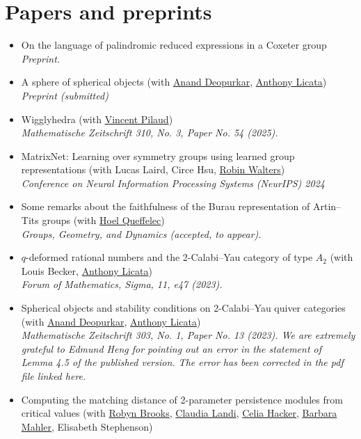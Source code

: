 \documentclass[a4paper]{moderncv}
\begin{document}
\section*{Papers and preprints}
\label{sec:orgbd9eb48}
\begin{itemize}
\item On the language of palindromic reduced expressions in a Coxeter group\\
\emph{Preprint.}
\item A sphere of spherical objects (with \href{https://deopurkar.github.io}{Anand Deopurkar}, \href{https://maths-people.anu.edu.au/\~licatat/Home.html}{Anthony Licata})\\
\emph{Preprint (submitted)}
\item Wigglyhedra (with \href{https://www.lix.polytechnique.fr/\~pilaud/}{Vincent Pilaud})\\
\emph{Mathematische Zeitschrift 310, No. 3, Paper No. 54 (2025).}
\item MatrixNet: Learning over symmetry groups using learned group representations (with Lucas Laird, Circe Hsu, \href{https://www.robinwalters.com/}{Robin Walters})\\
\emph{Conference on Neural Information Processing Systems (NeurIPS) 2024}
\item Some remarks about the faithfulness of the Burau representation of Artin--Tits groups (with \href{https://imag.umontpellier.fr/\~queffelec/}{Hoel Queffelec})\\
\emph{Groups, Geometry, and Dynamics (accepted, to appear).}
\item \(q\)-deformed rational numbers and the 2-Calabi--Yau category of type \(A_{2}\) (with Louis Becker, \href{https://maths-people.anu.edu.au/\~licatat/Home.html}{Anthony Licata})\\
\emph{Forum of Mathematics, Sigma, 11, e47 (2023).}
\item Spherical objects and stability conditions on 2-Calabi--Yau quiver categories (with \href{https://deopurkar.github.io}{Anand Deopurkar}, \href{https://maths-people.anu.edu.au/\~licatat/Home.html}{Anthony Licata})\\
\emph{Mathematische Zeitschrift 303, No. 1, Paper No. 13 (2023). We are extremely grateful to Edmund Heng for pointing out an error in the statement of Lemma 4.5 of the published version. The error has been corrected in the pdf file linked here.}
\item Computing the matching distance of 2-parameter persistence modules from critical values (with \href{https://sites.google.com/view/robynkayebrooks/home}{Robyn Brooks}, \href{http://personale.unimore.it/Rubrica/Dettaglio/clandi}{Claudia Landi}, \href{https://people.epfl.ch/celia.hacker/?lang=en}{Celia Hacker}, \href{https://www.maths.ox.ac.uk/people/barbara.mahler}{Barbara Mahler}, Elisabeth Stephenson)\\

\end{itemize}
\end{document}
